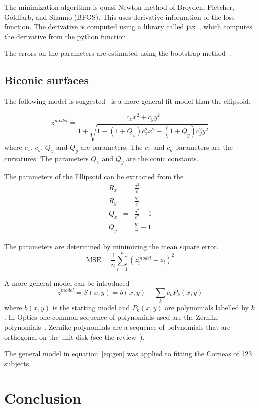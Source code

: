 \documentclass[12pt]{article}
\begin{document}
  The minimization algorithm is  quasi-Newton method of Broyden,
  Fletcher, Goldfarb, and Shanno (BFGS). This uses derivative
  information of the loss function. The derivative is computed using
  a library called jax~\cite{bradbury2021jax},
  which computes the derivative from the python
  function.

  The errors on the parameters are estimated using the bootstrap
method~\cite{efron1992bootstrap}.

 \subsection{Biconic surfaces}


 The following model is suggested~\cite{burek1993mathematical}
  is a more general fit model than the ellipsoid.
 
\begin{equation}
  z^{model}  = \frac{c_x x^2 + c_y y^2}
  {1 +  \sqrt{ 1 - (1 + Q_x) c_x^2 x^2  - (1 + Q_y) c_y^2 y^2   }   }
 \end{equation}
where $c_x$, $c_y$, $Q_x$ and $Q_y$  are parameters.
The $c_x$ and  $c_y$ parameters are the curvatures.
The parameters $Q_x$ and $Q_y$ are the conic constants.

The parameters of the Ellipsoid can be extracted from the 
\begin{eqnarray}
  R_x & = & \frac{a^2}{c}   \\
  R_y & = & \frac{b^2}{c}   \\
  Q_x & = & \frac{a^2}{c^2} - 1 \\
  Q_y & = & \frac{b^2}{c^2} - 1 
\end{eqnarray}
  
The parameters are determined by minimizing the mean square error.
\begin{equation}
\mbox{MSE} = \frac{1}{n} \sum_{i=1}^n (z^{model}_i - z_i )^2
\end{equation}


A more general model can be introduced
\begin{equation}
z^{model} = S(x,y) = b(x,y) + \sum_{k} c_k P_k(x,y) 
\label{eq:gen}
\end{equation}
where $b(x,y)$ is the starting model and
$P_k(x,y)$ are polynomials labelled by $k$.
In Optics one common sequence of polynomials used are the
Zernike polynomials~\cite{iskander2001optimal}.
Zernike polynomials are a sequence of polynomials
that are orthogonal on the unit disk (see the review~\cite{niu2022zernike}). 

The general model in equation~\ref{eq:gen} was
applied to fitting the Corneas of 123 subjects.

\section{Conclusion}



\end{document}
